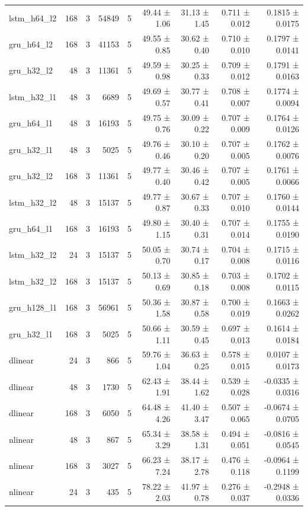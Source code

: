 \begin{table}[htbp]
\begin{tabular}{lrrrrrrrr}
lstm\_h64\_l2 & 168 & 3 & 54849 & 5 & 49.44 ± 1.06 & 31.13 ± 1.45 & 0.711 ± 0.012 & 0.1815 ± 0.0175 \\
gru\_h64\_l2 & 168 & 3 & 41153 & 5 & 49.55 ± 0.85 & 30.62 ± 0.40 & 0.710 ± 0.010 & 0.1797 ± 0.0141 \\
gru\_h32\_l2 & 48 & 3 & 11361 & 5 & 49.59 ± 0.98 & 30.25 ± 0.33 & 0.709 ± 0.012 & 0.1791 ± 0.0163 \\
lstm\_h32\_l1 & 48 & 3 & 6689 & 5 & 49.69 ± 0.57 & 30.77 ± 0.41 & 0.708 ± 0.007 & 0.1774 ± 0.0094 \\
gru\_h64\_l1 & 48 & 3 & 16193 & 5 & 49.75 ± 0.76 & 30.09 ± 0.22 & 0.707 ± 0.009 & 0.1764 ± 0.0126 \\
gru\_h32\_l1 & 48 & 3 & 5025 & 5 & 49.76 ± 0.46 & 30.10 ± 0.20 & 0.707 ± 0.005 & 0.1762 ± 0.0076 \\
gru\_h32\_l2 & 168 & 3 & 11361 & 5 & 49.77 ± 0.40 & 30.46 ± 0.42 & 0.707 ± 0.005 & 0.1761 ± 0.0066 \\
lstm\_h32\_l2 & 48 & 3 & 15137 & 5 & 49.77 ± 0.87 & 30.67 ± 0.33 & 0.707 ± 0.010 & 0.1760 ± 0.0144 \\
gru\_h64\_l1 & 168 & 3 & 16193 & 5 & 49.80 ± 1.15 & 30.40 ± 0.31 & 0.707 ± 0.014 & 0.1755 ± 0.0190 \\
lstm\_h32\_l2 & 24 & 3 & 15137 & 5 & 50.05 ± 0.70 & 30.74 ± 0.17 & 0.704 ± 0.008 & 0.1715 ± 0.0116 \\
lstm\_h32\_l2 & 168 & 3 & 15137 & 5 & 50.13 ± 0.69 & 30.85 ± 0.18 & 0.703 ± 0.008 & 0.1702 ± 0.0115 \\
gru\_h128\_l1 & 168 & 3 & 56961 & 5 & 50.36 ± 1.58 & 30.87 ± 0.58 & 0.700 ± 0.019 & 0.1663 ± 0.0262 \\
gru\_h32\_l1 & 168 & 3 & 5025 & 5 & 50.66 ± 1.11 & 30.59 ± 0.45 & 0.697 ± 0.013 & 0.1614 ± 0.0184 \\
dlinear & 24 & 3 & 866 & 5 & 59.76 ± 1.04 & 36.63 ± 0.25 & 0.578 ± 0.015 & 0.0107 ± 0.0173 \\
dlinear & 48 & 3 & 1730 & 5 & 62.43 ± 1.91 & 38.44 ± 1.62 & 0.539 ± 0.028 & -0.0335 ± 0.0316 \\
dlinear & 168 & 3 & 6050 & 5 & 64.48 ± 4.26 & 41.40 ± 3.47 & 0.507 ± 0.065 & -0.0674 ± 0.0705 \\
nlinear & 48 & 3 & 867 & 5 & 65.34 ± 3.29 & 38.58 ± 1.31 & 0.494 ± 0.051 & -0.0816 ± 0.0545 \\
nlinear & 168 & 3 & 3027 & 5 & 66.23 ± 7.24 & 38.17 ± 2.78 & 0.476 ± 0.118 & -0.0964 ± 0.1199 \\
nlinear & 24 & 3 & 435 & 5 & 78.22 ± 2.03 & 41.97 ± 0.78 & 0.276 ± 0.037 & -0.2948 ± 0.0336 \\

\end{tabular}
\end{table}
